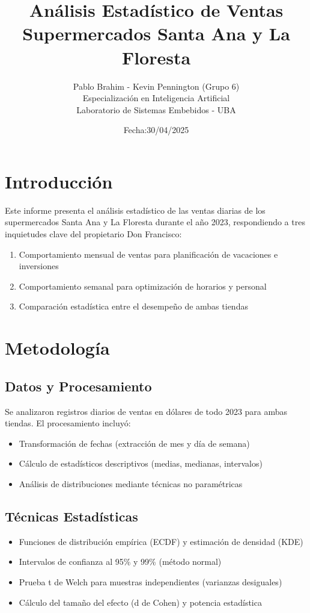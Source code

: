 \documentclass[12pt]{article}
\title{Análisis Estadístico de Ventas \\ Supermercados Santa Ana y La Floresta}
\author{Pablo Brahim - Kevin Pennington (Grupo 6) \\ 
Especialización en Inteligencia Artificial \\ 
Laboratorio de Sistemas Embebidos - UBA}
\date{Fecha:30/04/2025}
\begin{document}
\maketitle

\section{Introducción}
Este informe presenta el análisis estadístico de las ventas diarias de los supermercados Santa Ana y La Floresta durante el año 2023, respondiendo a tres inquietudes clave del propietario Don Francisco:

\begin{enumerate}
    \item Comportamiento mensual de ventas para planificación de vacaciones e inversiones
    \item Comportamiento semanal para optimización de horarios y personal
    \item Comparación estadística entre el desempeño de ambas tiendas
\end{enumerate}

\section{Metodología}

\subsection{Datos y Procesamiento}
Se analizaron registros diarios de ventas en dólares de todo 2023 para ambas tiendas. El procesamiento incluyó:

\begin{itemize}
    \item Transformación de fechas (extracción de mes y día de semana)
    \item Cálculo de estadísticos descriptivos (medias, medianas, intervalos)
    \item Análisis de distribuciones mediante técnicas no paramétricas
\end{itemize}

\subsection{Técnicas Estadísticas}
\begin{itemize}
    \item Funciones de distribución empírica (ECDF) y estimación de densidad (KDE)
    \item Intervalos de confianza al 95\% y 99\% (método normal)
    \item Prueba t de Welch para muestras independientes (varianzas desiguales)
    \item Cálculo del tamaño del efecto (d de Cohen) y potencia estadística
\end{itemize}
\end{document}
